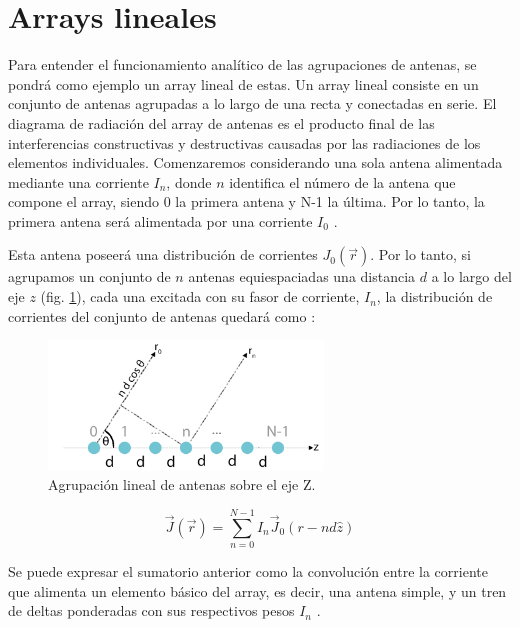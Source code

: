 \section{Arrays lineales}
\par Para entender el funcionamiento analítico de las agrupaciones de antenas, se pondrá como ejemplo un array lineal de estas. Un array lineal consiste en un conjunto de antenas agrupadas a lo largo de una recta y conectadas en serie. El diagrama de radiación del array de antenas es el producto final de las interferencias constructivas y destructivas causadas por las radiaciones de los elementos individuales. Comenzaremos considerando una sola antena alimentada mediante una corriente $I_{n}$, donde $n$ identifica el número de la antena que compone el array, siendo 0 la primera antena y N-1 la última. Por lo tanto, la primera antena será alimentada por una corriente $I_{0}$ \citep{Cardama2002}.
\\
\par Esta antena poseerá una distribución de corrientes $J_{0}(\vec{r})$. Por lo tanto, si agrupamos un conjunto de $n$ antenas equiespaciadas una distancia $d$ a lo largo del eje $z$ (fig. \ref{fig:arraigo}), cada una excitada con su fasor de corriente, $I_{n}$, la distribución de corrientes del conjunto de antenas quedará como \cite{Cardama2002}:

\begin{figure}[h]
    \centering
        \includegraphics[width=0.65\textwidth]{archivos/array/array}
        \caption{Agrupación lineal de antenas sobre el eje Z.}
        \label{fig:arraigo}
\end{figure}

\begin{equation}
	\vec{J}\left ( \vec{r} \right )=\sum_{n=0}^{N-1}I_{n}\vec{J}_{0}(r-nd\hat{z})
	\label{eq:distrib}
\end{equation}

\par Se puede expresar el sumatorio anterior como la convolución entre la corriente que alimenta un elemento básico del array, es decir, una antena simple, y un tren de deltas ponderadas con sus respectivos pesos $I_{n}$ \cite{Cardama2002}.

